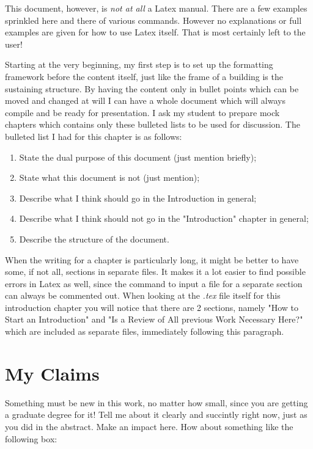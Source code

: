 This document, however, is \textit{not at all} a Latex manual. There are a few examples sprinkled here and there of various commands. However no explanations or full examples are given for how to use Latex itself. That is most certainly left to the user!

Starting at the very beginning, my first step is to set up the formatting framework before the content itself, just like the frame of a building is the sustaining structure. By having the content only in bullet points which can be moved and changed at will I can have a whole document which will always compile and be ready for presentation. I ask my student to prepare mock chapters which contains only these bulleted lists to be used for discussion. The bulleted list I had for this chapter is as follows:
\begin{enumerate}
        \item State the dual purpose of this document (just mention briefly);
        \item State what this document is not (just mention);
        \item Describe what I think should go in the Introduction in general;
        \item Describe what I think should not go in the "Introduction" chapter in general;
        \item Describe the structure of the document.
\end{enumerate}

When the writing for a chapter is particularly long, it might be better to have some, if not all, sections in separate files. It makes it a lot easier to find possible errors in Latex as well, since the command to input a file for a separate section can always be commented out. When looking at the \textit{.tex} file itself for this introduction chapter you will notice that there are 2 sections, namely "How to Start an Introduction" and "Is a Review of All previous Work Necessary Here?" which are included as separate files, immediately following this paragraph.


\section{My Claims}
Something must be new in this work, no matter how small, since you are getting a graduate degree for it! Tell me about it clearly and succintly right now, just as you did in the abstract. Make an impact here. How about something like the following box:

